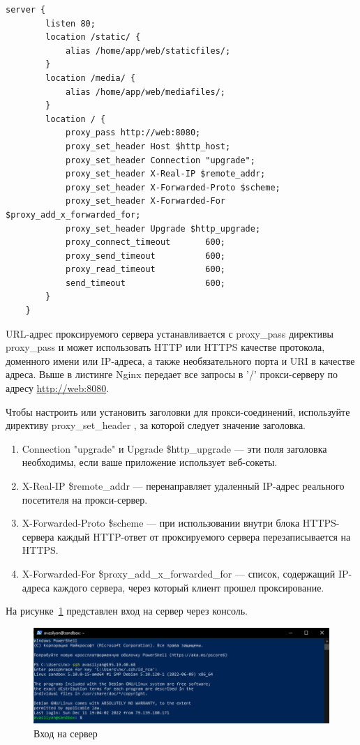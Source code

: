 \begin{lstlisting}[frame=single, label={rndhpcgui.2022.12.07.nginx.conf}, caption={nginx.conf}, language={nginx}] 
	server {
	    listen 80;
	    location /static/ {
	        alias /home/app/web/staticfiles/;
	    }
	    location /media/ {
	        alias /home/app/web/mediafiles/;
	    }
	    location / {
	        proxy_pass http://web:8080;
	        proxy_set_header Host $http_host;
	        proxy_set_header Connection "upgrade";
	        proxy_set_header X-Real-IP $remote_addr;
	        proxy_set_header X-Forwarded-Proto $scheme;
	        proxy_set_header X-Forwarded-For $proxy_add_x_forwarded_for;
	        proxy_set_header Upgrade $http_upgrade;
	        proxy_connect_timeout       600;
	        proxy_send_timeout          600;
	        proxy_read_timeout          600;
	        send_timeout                600;
	    }
	}
\end{lstlisting}

URL-адрес проксируемого сервера устанавливается с proxy_pass директивы proxy_pass и может использовать HTTP или HTTPS качестве протокола, доменного имени или IP-адреса, а также необязательного порта и URI в качестве адреса. Выше в листинге Nginx передает все запросы в '/' прокси-серверу по адресу \url{http://web:8080}.

Чтобы настроить или установить заголовки для прокси-соединений, используйте директиву proxy_set_header , за которой следует значение заголовка. 
\begin{enumerate}
	\item Connection "upgrade" и Upgrade \$http\_upgrade — эти поля заголовка необходимы, если ваше приложение использует веб-сокеты.
	\item X-Real-IP \$remote_addr — перенаправляет удаленный IP-адрес реального посетителя на прокси-сервер.
	\item X-Forwarded-Proto \$scheme — при использовании внутри блока HTTPS-сервера каждый HTTP-ответ от проксируемого сервера перезаписывается на HTTPS.
	\item X-Forwarded-For \$proxy_add_x_forwarded_for — список, содержащий IP-адреса каждого сервера, через который клиент прошел проксирование.
\end{enumerate}

На рисунке~\ref{rndhpcgui.2022.12.07.picture1} представлен вход на сервер через консоль. 
\begin{figure}[!ht]
  \centering
  \includegraphics[scale=0.8]{ResearchNotes/rndhpc_dev_gui_2022_12_07/rndhpcgui.2022.12.07.picture1.png}
  \caption{Вход на сервер}\label{rndhpcgui.2022.12.07.picture1}
\end{figure}

